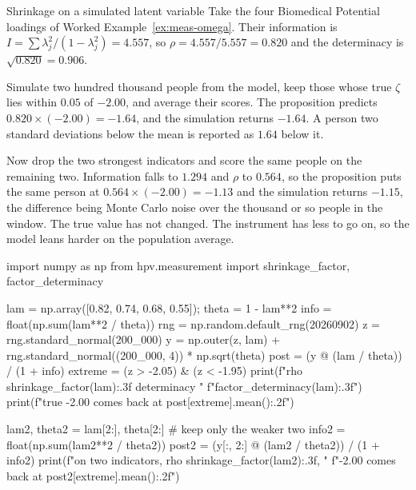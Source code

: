 \begin{workedexample}{Shrinkage on a simulated latent variable}
Take the four Biomedical Potential loadings of Worked
Example~\ref{ex:meas-omega}. Their information is
$I=\sum\lambda_j^{2}/(1-\lambda_j^{2})=4.557$, so
$\rho=4.557/5.557=0.820$ and the determinacy is $\sqrt{0.820}=0.906$.

Simulate two hundred thousand people from the model, keep those whose true
$\zeta$ lies within $0.05$ of $-2.00$, and average their scores. The
proposition predicts $0.820\times(-2.00)=-1.64$, and the simulation returns
$-1.64$. A person two standard deviations below the mean is reported
as $1.64$ below it.

Now drop the two strongest indicators and score the same people on the
remaining two. Information falls to $1.294$ and $\rho$ to $0.564$, so the
proposition puts the same person at $0.564\times(-2.00)=-1.13$ and the
simulation returns $-1.15$, the difference being Monte Carlo noise over the
thousand or so people in the window. The true value has not changed. The
instrument has less to go on, so the model leans harder on the population
average.

\begin{wecode}[Python]
import numpy as np
from hpv.measurement import shrinkage_factor, factor_determinacy

lam = np.array([0.82, 0.74, 0.68, 0.55]); theta = 1 - lam**2
info = float(np.sum(lam**2 / theta))
rng = np.random.default_rng(20260902)
z = rng.standard_normal(200_000)
y = np.outer(z, lam) + rng.standard_normal((200_000, 4)) * np.sqrt(theta)
post = (y @ (lam / theta)) / (1 + info)
extreme = (z > -2.05) & (z < -1.95)
print(f"rho {shrinkage_factor(lam):.3f}  determinacy "
      f"{factor_determinacy(lam):.3f}")
print(f"true -2.00 comes back at {post[extreme].mean():.2f}")

lam2, theta2 = lam[2:], theta[2:]           # keep only the weaker two
info2 = float(np.sum(lam2**2 / theta2))
post2 = (y[:, 2:] @ (lam2 / theta2)) / (1 + info2)
print(f"on two indicators, rho {shrinkage_factor(lam2):.3f}, "
      f"-2.00 comes back at {post2[extreme].mean():.2f}")
\end{wecode}

\end{workedexample}

